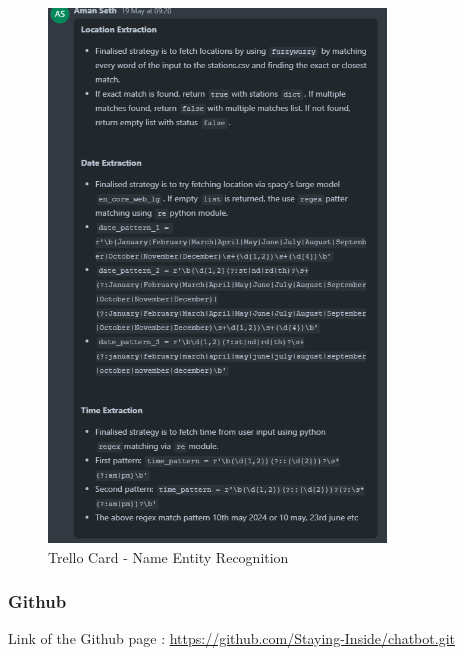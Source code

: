 \begin{figure}[!htbp]
    \centering
    \includegraphics[width=0.8\textwidth]{Diagrams/Group_work/trello_card_2.png}
    \caption{Trello Card - Name Entity Recognition}
    \label{Fig: trello_card_nlp}
\end{figure}

\clearpage
\subsubsection{Github}
Link of the Github page : \url{https://github.com/Staying-Inside/chatbot.git}

